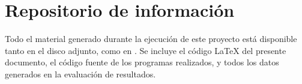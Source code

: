 

\section{Repositorio de información}
Todo el material generado durante la ejecución de este proyecto está disponible tanto en el disco adjunto, como en \thegitrepo{}. Se incluye el código \LaTeX{} del presente documento, el código fuente de los programas realizados, y todos los datos generados en la evaluación de resultados.




